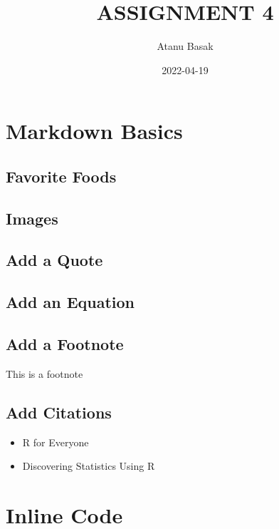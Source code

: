 \documentclass[
]{article}
\title{ASSIGNMENT 4}
\author{Atanu Basak}
\date{2022-04-19}
\providecommand{\tightlist}{%
  \setlength{\itemsep}{0pt}\setlength{\parskip}{0pt}}
\begin{document}
\maketitle

\hypertarget{markdown-basics}{%
\section{Markdown Basics}\label{markdown-basics}}

\hypertarget{favorite-foods}{%
\subsection{Favorite Foods}\label{favorite-foods}}

\hypertarget{images}{%
\subsection{Images}\label{images}}

\hypertarget{add-a-quote}{%
\subsection{Add a Quote}\label{add-a-quote}}

\hypertarget{add-an-equation}{%
\subsection{Add an Equation}\label{add-an-equation}}

\hypertarget{add-a-footnote}{%
\subsection{Add a Footnote}\label{add-a-footnote}}

This is a footnote

\hypertarget{add-citations}{%
\subsection{Add Citations}\label{add-citations}}

\begin{itemize}
\tightlist
\item
  R for Everyone
\item
  Discovering Statistics Using R
\end{itemize}

\hypertarget{inline-code}{%
\section{Inline Code}\label{inline-code}}
\end{document}
